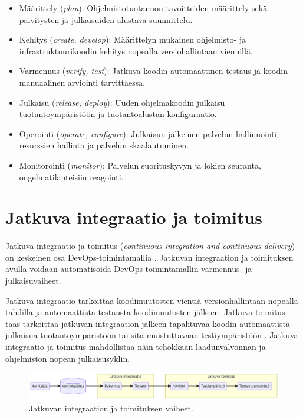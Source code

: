 \begin{itemize}
\item Määrittely (\textit{plan}): Ohjelmistotuotannon tavoitteiden määrittely sekä päivitysten ja julkaisuiden alustava suunnittelu.
\item Kehitys (\textit{create, develop}): Määrittelyn mukainen ohjelmisto- ja infrastruktuurikoodin kehitys nopealla versiohallintaan viennillä.
\item Varmennus (\textit{verify, test}): Jatkuva koodin automaattinen testaus ja koodin manuaalinen arviointi tarvittaessa.
\item Julkaisu (\textit{release, deploy}): Uuden ohjelmakoodin julkaisu tuotantoympäristöön ja tuotantoalustan konfiguraatio.
\item Operointi (\textit{operate, configure}): Julkaisun jälkeinen palvelun hallinnointi, resurssien hallinta ja palvelun skaalautuminen.
\item Monitorointi (\textit{monitor}): Palvelun suorituskyvyn ja lokien seuranta, ongelmatilanteisiin reagointi.
\end{itemize}

\section{Jatkuva integraatio ja toimitus}

Jatkuva integraatio ja toimitus (\textit{continuous integration and continuous delivery}) on keskeinen osa DevOps-toimintamallia \cite{Jabbari16, Leite19}.
Jatkuvan integraation ja toimituksen avulla voidaan automatisoida DevOps-toimintamallin varmennus- ja julkaisuvaiheet.

Jatkuva integraatio tarkoittaa koodimuutosten vientiä versionhallintaan nopealla tahdilla ja automaattista testausta koodimuutosten jälkeen.
Jatkuva toimitus taas tarkoittaa jatkuvan integraation jälkeen tapahtuvaa koodin automaattista julkaisua tuotantoympäristöön tai sitä muistuttavaan testiympäristöön \cite{Shahin17}.
Jatkuva integraatio ja toimitus mahdollistaa näin tehokkaan laadunvalvonnan ja ohjelmiston nopean julkaisusyklin.

\begin{figure}[ht]
\begin{center}
\includegraphics[width=1\textwidth]{figures/cicd-pipeline.png}
\caption{Jatkuvan integraation ja toimituksen vaiheet.\label{fig:cicd}}
\end{center}
\end{figure}

